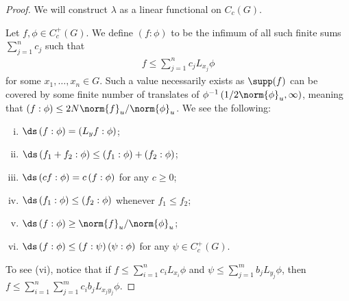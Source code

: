 \documentclass[10pt]{mypackage}
\begin{document}
\begin{proof}
  We will construct $\lambda$ as a linear functional on $C_c(G)$.\newline

  Let $f,\phi\in C_c^{+}(G)$. We define $\left( f:\phi \right)$ to be the infimum of all such finite sums $\sum_{j=1}^{n}c_j$ such that 
  \begin{align*}
    f\leq \sum_{j=1}^{n}c_jL_{x_j}\phi
  \end{align*}
  for some $x_1,\dots,x_n\in G$. Such a value necessarily exists as $\supp(f)$ can be covered by some finite number of translates of $\phi^{-1}\left( 1/2\norm{\phi}_u,\infty \right)$, meaning that $\left( f:\phi \right)\leq 2N\norm{f}_{u}/\norm{\phi}_u$. We see the following:
  \begin{enumerate}[(i)]
    \item $ \ds \left( f:\phi \right) = \left( L_yf:\phi \right) $;
    \item $ \ds \left( f_1 + f_2:\phi \right) \leq \left( f_1:\phi \right) + \left( f_2:\phi \right) $;
    \item $\ds \left( cf:\phi \right) = c\left( f:\phi \right)$ for any $c \geq 0$;
    \item $\ds \left( f_1:\phi \right) \leq \left( f_2:\phi \right)$ whenever $f_1\leq f_2$;
    \item $ \ds \left( f:\phi \right) \geq \norm{f}_{u}/\norm{\phi}_{u} $;
    \item $\ds \left( f:\phi \right)\leq \left( f:\psi \right)\left( \psi:\phi \right)$ for any $\psi\in C_c^{+}\left( G \right)$.
  \end{enumerate}
  To see (vi), notice that if $f\leq \sum_{i=1}^{n}c_iL_{x_i}\phi$ and $\psi\leq \sum_{j=1}^{m}b_jL_{y_j}\phi$, then $f\leq \sum_{i=1}^{n}\sum_{j=1}^{m}c_ib_jL_{x_jy_j}\phi$.\newline


\end{proof}
\end{document}
